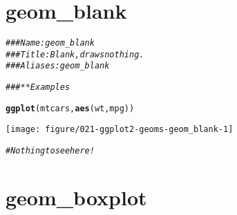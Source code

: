 \documentclass[a4paper,titlepage]{tufte-handout}\usepackage[]{graphicx}\usepackage[]{color}
\makeatletter
\def\maxwidth{ %
  \ifdim\Gin@nat@width>\linewidth
    \linewidth
  \else
    \Gin@nat@width
  \fi
}
\newcommand{\hlcom}[1]{\textcolor[rgb]{0.678,0.584,0.686}{\textit{#1}}}%
\newcommand{\hlstd}[1]{\textcolor[rgb]{0.345,0.345,0.345}{#1}}%
\newcommand{\hlkwd}[1]{\textcolor[rgb]{0.737,0.353,0.396}{\textbf{#1}}}%
\newenvironment{kframe}{%
 \def\at@end@of@kframe{}%
 \ifinner\ifhmode%
  \def\at@end@of@kframe{\end{minipage}}%
  \begin{minipage}{\columnwidth}%
 \fi\fi%
 \def\FrameCommand##1{\hskip\@totalleftmargin \hskip-\fboxsep
 \colorbox{shadecolor}{##1}\hskip-\fboxsep
     \hskip-\linewidth \hskip-\@totalleftmargin \hskip\columnwidth}%
 \MakeFramed {\advance\hsize-\width
   \@totalleftmargin\z@ \linewidth\hsize
   \@setminipage}}%
 {\par\unskip\endMakeFramed%
 \at@end@of@kframe}
\newenvironment{knitrout}{}{} %
\makeatother
\begin{document}
\section{geom\_blank}

\begin{knitrout}
\color{fgcolor}\begin{kframe}
\begin{alltt}
\hlcom{### Name: geom_blank}
\hlcom{### Title: Blank, draws nothing.}
\hlcom{### Aliases: geom_blank}

\hlcom{### ** Examples}

\hlkwd{ggplot}\hlstd{(mtcars,} \hlkwd{aes}\hlstd{(wt, mpg))}
\end{alltt}
\end{kframe}
\texttt{[image: figure/021-ggplot2-geoms-geom\_blank-1]} 
\begin{kframe}\begin{alltt}
\hlcom{# Nothing to see here!}
\end{alltt}
\end{kframe}
\end{knitrout}


\section{geom\_boxplot}
\end{document}

